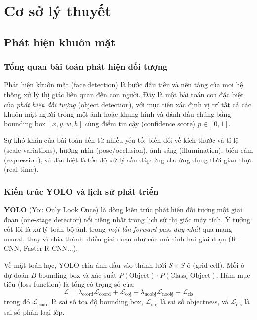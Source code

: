\section{Cơ sở lý thuyết}
\label{sec:cosoly}

\subsection{Phát hiện khuôn mặt}
\label{subsec:phatdien}

\subsubsection{Tổng quan bài toán phát hiện đối tượng}
\label{subsubsec:toanbai}

Phát hiện khuôn mặt (face detection) là bước đầu tiên và nền tảng của mọi hệ thống xử lý thị giác liên quan đến con người. Đây là một bài toán con đặc biệt của \textit{phát hiện đối tượng} (object detection), với mục tiêu xác định vị trí tất cả các khuôn mặt người trong một ảnh hoặc khung hình và đánh dấu chúng bằng bounding box $[x, y, w, h]$ cùng điểm tin cậy (confidence score) $p \in [0, 1]$.

\medskip
Sự khó khăn của bài toán đến từ nhiều yếu tố: biến đổi về kích thước và tỉ lệ (scale variations), hướng nhìn (pose/occlusion), ánh sáng (illumination), biểu cảm (expression), và đặc biệt là tốc độ xử lý cần đáp ứng cho ứng dụng thời gian thực (real-time).

\subsubsection{Kiến trúc YOLO và lịch sử phát triển}
\label{subsubsec:yolo}

\textbf{YOLO} (You Only Look Once) \cite{redmon2016yolo} là dòng kiến trúc phát hiện đối tượng một giai đoạn (one-stage detector) nổi tiếng nhất trong lịch sử thị giác máy tính. Ý tưởng cốt lõi là xử lý toàn bộ ảnh trong \textit{một lần forward pass duy nhất} qua mạng neural, thay vì chia thành nhiều giai đoạn như các mô hình hai giai đoạn (R-CNN, Faster R-CNN...).

\medskip
Về mặt toán học, YOLO chia ảnh đầu vào thành lưới $S \times S$ ô (grid cell). Mỗi ô dự đoán $B$ bounding box và xác suất $P(\text{Object}) \cdot P(\text{Class}_i | \text{Object})$. Hàm mục tiêu (loss function) là tổng có trọng số của:
\begin{equation}
    \mathcal{L} = \lambda_{\text{coord}} \mathcal{L}_{\text{coord}} + \mathcal{L}_{\text{obj}} + \lambda_{\text{noobj}}\mathcal{L}_{\text{noobj}} + \mathcal{L}_{\text{cls}}
\end{equation}
trong đó $\mathcal{L}_{\text{coord}}$ là sai số toạ độ bounding box, $\mathcal{L}_{\text{obj}}$ là sai số objectness, và $\mathcal{L}_{\text{cls}}$ là sai số phân loại lớp.


